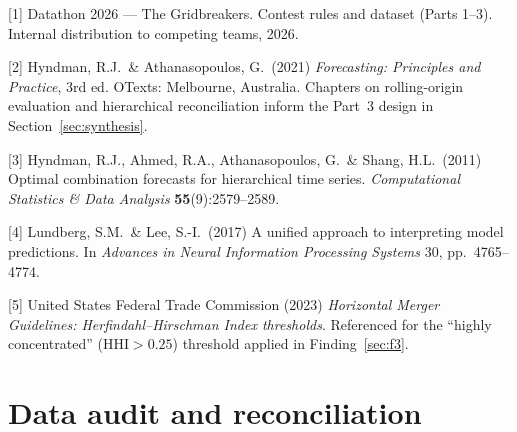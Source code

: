 \documentclass{article}
\begin{document}
\small
[1] Datathon 2026 --- The Gridbreakers. Contest rules and dataset (Parts 1--3). Internal distribution to competing teams, 2026.

[2] Hyndman, R.J.\ \& Athanasopoulos, G.\ (2021) \emph{Forecasting: Principles and Practice}, 3rd ed. OTexts: Melbourne, Australia. Chapters on rolling-origin evaluation and hierarchical reconciliation inform the Part~3 design in Section~\ref{sec:synthesis}.

[3] Hyndman, R.J., Ahmed, R.A., Athanasopoulos, G.\ \& Shang, H.L.\ (2011) Optimal combination forecasts for hierarchical time series. \emph{Computational Statistics \& Data Analysis} \textbf{55}(9):2579--2589.

[4] Lundberg, S.M.\ \& Lee, S.-I.\ (2017) A unified approach to interpreting model predictions. In \emph{Advances in Neural Information Processing Systems} 30, pp.\ 4765--4774.

[5] United States Federal Trade Commission (2023) \emph{Horizontal Merger Guidelines: Herfindahl--Hirschman Index thresholds}. Referenced for the ``highly concentrated'' ($\text{HHI}>0.25$) threshold applied in Finding~\ref{sec:f3}.



\appendix

\section{Data audit and reconciliation}
\label{app:audit}
\end{document}
